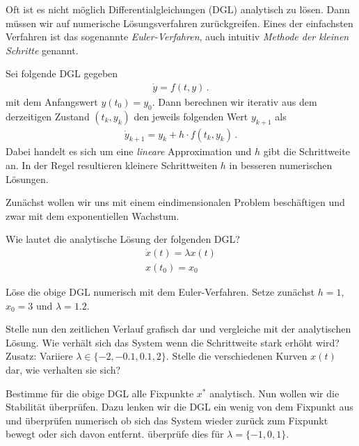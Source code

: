 
 \exercise[%
 topic = Numerisches L\"osen von Differentialgleichungen
  ]


Oft ist es nicht m\"oglich Differentialgleichungen (DGL) analytisch zu l\"osen. Dann m\"ussen wir auf numerische L\"osungsverfahren zur\"uckgreifen. Eines der einfachsten Verfahren ist das sogenannte \emph{Euler-Verfahren}, auch intuitiv \emph{Methode der kleinen Schritte} genannt.

Sei folgende DGL gegeben 
\begin{align}
\dot y = f(t,y)\,.
\end{align}
mit dem Anfangswert $y(t_0)=y_0$. Dann berechnen wir iterativ aus dem derzeitigen Zustand $(t_k,y_k)$ den jeweils folgenden Wert $y_{k+1}$ als
\begin{align}
\dot y_{k+1} =y_k + h\cdot f(t_k,y_k)\,.
\end{align}
Dabei handelt es sich um eine \emph{lineare} Approximation und $h$ gibt die Schrittweite an. In der Regel resultieren kleinere Schrittweiten $h$ in besseren numerischen L\"osungen.

 \subexercise[%
  topic={Exponentielles Wachstum},
    ]
		
Zun\"achst wollen wir uns mit einem eindimensionalen Problem besch\"aftigen und zwar mit dem exponentiellen Wachstum.

Wie lautet die analytische L\"osung der folgenden DGL?
\begin{align}
\dot x(t) = \lambda x(t)\\
x(t_0)=x_0
\label{eqn:exponentielles}
\end{align}

\subexercise[%
  topic={Eindimensionales Euler-Verfahren},
    ]
L\"ose die obige DGL numerisch mit dem Euler-Verfahren. Setze zun\"achst $h=1$, $x_0=3$ und $\lambda=1.2$.

Stelle nun den zeitlichen Verlauf grafisch dar und vergleiche mit der analytischen L\"osung. Wie verh\"alt sich das System wenn die Schrittweite stark erh\"oht wird?\\
Zusatz: Variiere $\lambda \in \{-2,-0.1,0.1,2\}$. Stelle die verschiedenen Kurven $x(t)$ dar, wie verhalten sie sich? 

\subexercise[%
  topic={Numerisches \"uberpr\"ufen der Stabilit\"at von Fixpunkten},
    ]
Bestimme f\"ur die obige DGL alle Fixpunkte $x^{*}$ analytisch. Nun wollen wir die Stabilit\"at \"uberpr\"ufen. Dazu lenken wir die DGL ein wenig von dem Fixpunkt aus und \"uberpr\"ufen numerisch ob sich das System wieder zur\"uck zum Fixpunkt bewegt oder sich davon entfernt.
\"uberpr\"ufe dies f\"ur $\lambda = \{-1,0,1\}$.

